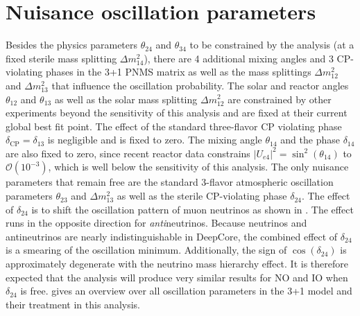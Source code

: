 \section{Nuisance oscillation parameters}
Besides the physics parameters $\theta_{24}$ and $\theta_{34}$ to be constrained by the analysis (at a fixed sterile mass splitting $\Delta m^2_{14}$), there are 4 additional mixing angles and 3 CP-violating phases in the 3+1 PNMS matrix as well as the mass splittings $\Delta m^2_{12}$ and $\Delta m^2_{13}$ that influence the oscillation probability. The solar and reactor angles $\theta_{12}$ and $\theta_{13}$ as well as the solar mass splitting $\Delta m^2_{12}$ are constrained by other experiments beyond the sensitivity of this analysis and are fixed at their current global best fit point. The effect of the standard three-flavor CP violating phase $\delta_{\mathrm{CP}}=\delta_{13}$ is negligible and is fixed to zero. The mixing angle $\theta_{14}$ and the phase $\delta_{14}$ are also fixed to zero, since recent reactor data constrains $|U_{e4}|^2 = \sin^2(\theta_{14})$ to $\mathcal{O}(10^{-3})$, which is well below the sensitivity of this analysis. The only nuisance parameters that remain free are the standard 3-flavor atmospheric oscillation parameters $\theta_{23}$ and $\Delta m^2_{13}$ as well as the sterile CP-violating phase $\delta_{24}$. The effect of $\delta_{24}$ is to shift the oscillation pattern of muon neutrinos as shown in . The effect runs in the opposite direction for \emph{anti}neutrinos. Because neutrinos and antineutrinos are nearly indistinguishable in DeepCore, the combined effect of $\delta_{24}$ is a smearing of the oscillation minimum. Additionally, the sign of $\cos(\delta_{24})$ is approximately degenerate with the neutrino mass hierarchy effect. It is therefore expected that the analysis will produce very similar results for NO and IO when $\delta_{24}$ is free.  gives an overview over all oscillation parameters in the 3+1 model and their treatment in this analysis.
